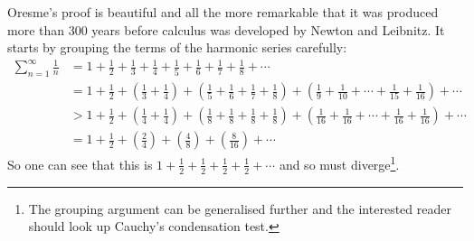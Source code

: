 Oresme's proof is beautiful and all the more remarkable that it was
produced more than 300 years before calculus was developed by Newton
and Leibnitz. It starts by grouping the terms of the harmonic series
carefully:
\begin{align*}
  \sum_{n=1}^\infty \frac{1}{n}
  &= 1 + \frac{1}{2} + \frac{1}{3} + \frac{1}{4} + \frac{1}{5} + \frac{1}{6} + \frac{1}{7} + \frac{1}{8} + \cdots \\
  &= 1 + \frac{1}{2}
  + \left( \frac{1}{3} + \frac{1}{4} \right)
  + \left( \frac{1}{5} + \frac{1}{6} + \frac{1}{7} + \frac{1}{8} \right)
  + \left( \frac{1}{9} + \frac{1}{10} + \cdots + \frac{1}{15} + \frac{1}{16} \right)
  + \cdots \\
  &> 1 + \frac{1}{2}
  + \left( \frac{1}{4} + \frac{1}{4} \right)
  + \left( \frac{1}{8} + \frac{1}{8} + \frac{1}{8} + \frac{1}{8} \right)
  + \left( \frac{1}{16} + \frac{1}{16} + \cdots + \frac{1}{16} + \frac{1}{16} \right)
  + \cdots
  \\
  &= 1 + \frac{1}{2} + \left( \frac{2}{4} \right) + \left( \frac{4}{8}  \right)
       + \left( \frac{8}{16}  \right) + \cdots
\end{align*}
So one can see that this is $1 + \frac{1}{2} +\frac{1}{2}+\frac{1}{2}
+\frac{1}{2} +\cdots$ and so must diverge\footnote{%
The grouping argument can be generalised further and the interested reader should look up Cauchy's condensation test.
}.



